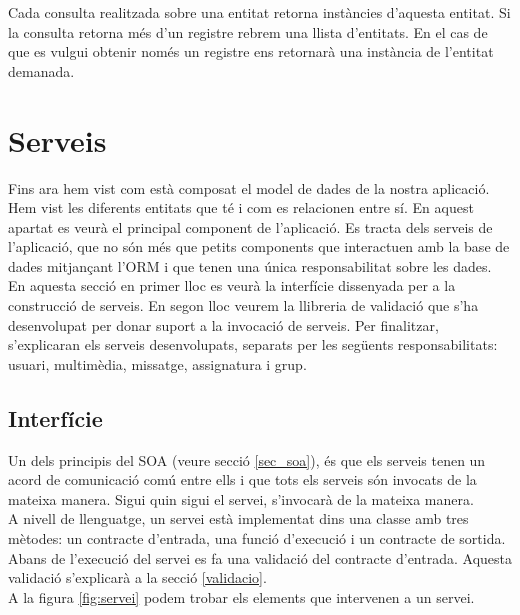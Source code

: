 	Cada consulta realitzada sobre una entitat retorna instàncies d'aquesta entitat. Si la consulta retorna més d'un registre rebrem una llista d'entitats. En el cas de que es vulgui obtenir només un registre ens retornarà una instància de l'entitat demanada.

  
\section{Serveis}
	Fins ara hem vist com està composat el model de dades de la nostra aplicació. Hem vist les diferents entitats que té i com es relacionen entre sí. En aquest apartat es veurà el principal component de l'aplicació. Es tracta dels serveis de l'aplicació, que no són més que petits components que interactuen amb la base de dades mitjançant l'\ac{ORM} i que tenen una única responsabilitat sobre les dades. \\
	
	En aquesta secció en primer lloc es veurà la interfície dissenyada per a la construcció de serveis. En segon lloc veurem la llibreria de validació que s'ha desenvolupat per donar suport a la invocació de serveis. Per finalitzar, s'explicaran els serveis desenvolupats, separats per les següents responsabilitats: usuari, multimèdia, missatge, assignatura i grup.
	
	\subsection{Interfície}
	
	Un dels principis del \ac{SOA} (veure secció \ref{sec_soa}), és que els serveis tenen un acord de comunicació comú entre ells i que tots els serveis són invocats de la mateixa manera. Sigui quin sigui el servei, s'invocarà de la mateixa manera.\\
	
	A nivell de llenguatge, un servei està implementat dins una classe amb tres mètodes: un contracte d'entrada, una funció d'execució i un contracte de sortida. Abans de l'execució del servei es fa una validació del contracte d'entrada. Aquesta validació s'explicarà a la secció \ref{validacio}.\\
	
	 A la figura \ref{fig:servei} podem trobar els elements que intervenen a un servei.\\
	
